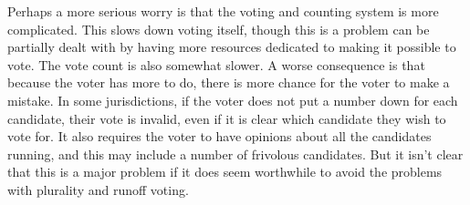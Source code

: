 Perhaps a more serious worry is that the voting and counting system is more complicated. This slows down voting itself, though this is a problem can be partially dealt with by having more resources dedicated to making it possible to vote. The vote count is also somewhat slower. A worse consequence is that because the voter has more to do, there is more chance for the voter to make a mistake. In some jurisdictions, if the voter does not put a number down for each candidate, their vote is invalid, even if it is clear which candidate they wish to vote for. It also requires the voter to have opinions about all the candidates running, and this may include a number of frivolous candidates. But it isn't clear that this is a major problem if it does seem worthwhile to avoid the problems with plurality and runoff voting.
